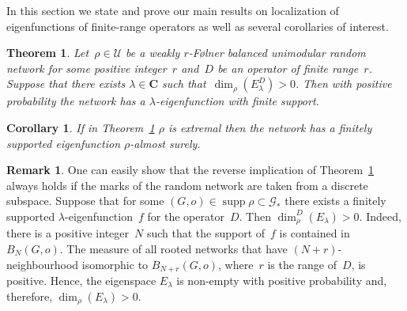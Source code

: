 \documentclass[english]{article}
\newtheorem{corollary}[lemma]{Corollary}
\newtheorem{theorem}[lemma]{Theorem}
\theoremstyle{definition}
\newtheorem{remark}[lemma]{Remark}
\DeclareMathOperator{\supp}{supp}%
\newcommand*{\field}[1]{\mathbf{#1}} %
\newcommand*\C{\field{C}} %
\begin{document}
In this section we state and prove our main results on localization of eigenfunctions of finite-range operators as well as several corollaries of interest. 

\begin{theorem}\label{theorem:main}
    Let~$\rho \in \mathcal{U}$ be a weakly $r$-{F\o lner} balanced unimodular random network for some positive integer~$r$ and~$D$ be an operator of finite range~$r$. Suppose that there exists $\lambda\in \C$ such that~$\dim_\rho(E_\lambda^D) > 0$. Then with positive probability the network has a $\lambda$-eigenfunction with finite support.
\end{theorem}

\begin{corollary}
    If in Theorem~\ref{theorem:main} $\rho$ is extremal then the network has a finitely supported eigenfunction $\rho$-almost surely.
\end{corollary}

\begin{remark}
    One can easily show that the reverse implication of Theorem~\ref{theorem:main} always holds if the marks of the random network are taken from a discrete subspace. Suppose that for some $(G,o) \in \supp \rho \subset \mathcal{G}_*$  there exists a finitely supported $\lambda$-eigenfunction~$f$ for the operator~$D$. Then $\dim_\rho^D(E_\lambda) > 0$. Indeed, there is a positive integer~$N$ such that the support of~$f$ is contained in $B_N(G,o)$. The measure of all rooted networks that have $(N+r)$-neighbourhood isomorphic to $B_{N+r}(G,o)$, where~$r$ is the range of~$D$, is positive. Hence, the eigenspace $E_\lambda$ is non-empty with positive probability and, therefore, $\dim_\rho(E_\lambda) > 0$.   
\end{remark}
\end{document}

